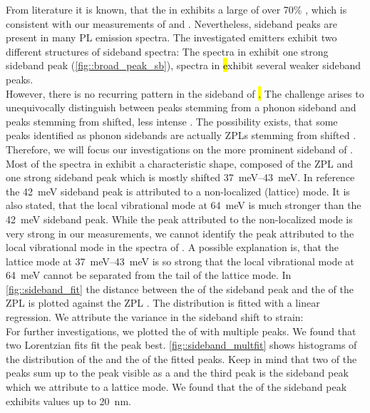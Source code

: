 		From literature it is known, that the \siv in \nd exhibits a large \db of over 70\% \cite{Neu2011,Neu2011b}, which is consistent with our measurements of \emnarrow and \embroad.
		Nevertheless, sideband peaks are present in many \siv PL emission spectra.
		The investigated emitters exhibit two different structures of sideband spectra: The spectra in \vl exhibit one strong sideband peak (\autoref{fig::broad_peak_sb}), spectra in \hl exhibit several weaker sideband peaks.
		\\
		However, there is no recurring pattern in the sideband of \hl.
		The challenge arises to unequivocally distinguish between peaks stemming from a phonon sideband and peaks stemming from shifted, less intense \siv \ZPLs.
		The possibility exists, that some peaks identified as phonon sidebands are actually ZPLs stemming from shifted \sivs.
		Therefore, we will focus our investigations on the more prominent sideband of \vl.
		\\
		Most of the spectra in \vl exhibit a characteristic shape, composed of the ZPL and one strong sideband peak which is mostly shifted \SIrange{37}{43}{meV}. 
		In reference \cite{Dietrich2014} the \SI{42}{meV} sideband peak is attributed to a non-localized (lattice) mode.
		It is also stated, that the local vibrational mode at \SI{64}{meV} is much stronger than the  \SI{42}{meV} sideband peak.
		While the peak attributed to the non-localized mode is very strong in our measurements, we cannot identify the peak attributed to the local vibrational \siv mode in the spectra of \vl.
		A possible explanation is, that the lattice mode at \SIrange{37}{43}{meV} is so strong that the local vibrational mode at \SI{64}{meV} cannot be separated from the tail of the lattice mode.
		In \autoref{fig::sideband_fit} the distance between the \cwl of the sideband peak and the \cwl of the ZPL is plotted against the ZPL \cwl.
		The distribution is fitted with a linear regression.
		We attribute the variance in the sideband shift to strain: 
		\\
		For further investigations, we plotted the \ZPL  of \vl with multiple peaks.
		We found that two Lorentzian fits fit the peak best.
		\autoref{fig::sideband_multfit} shows histograms of the distribution of the \cw and the \lw of the fitted peaks.
		Keep in mind that two of the peaks sum up to the peak visible as a \ZPL and the third peak is the sideband peak which we attribute to a lattice mode.
		We found that the \lw of the sideband peak exhibits values up to \SI{20}{nm}.

